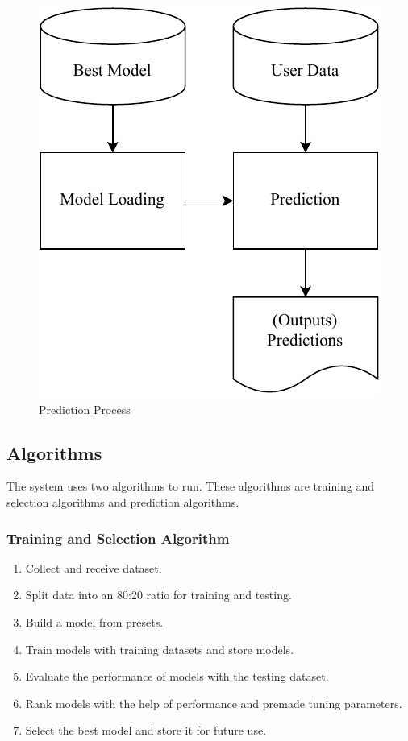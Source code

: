 \documentclass[a4paper,fleqn]{cas-dc}
\begin{document}
\begin{figure}[ht]
    \centering
    \includegraphics[width=0.7\columnwidth]{prediction.pdf}
    \caption{Prediction Process}
    \label{fig:prediction_process}
\end{figure}

\subsection{Algorithms}\label{subsec:algorithms}

The system uses two algorithms to run. These algorithms are training and selection algorithms and prediction algorithms.

\vspace{-0.5em}
\subsubsection*{Training and Selection Algorithm}\label{subsubsec:training_and_selection_algorithm}
\vspace{0.5em}
\begin{enumerate}
    \item Collect and receive dataset.
    \item Split data into an 80:20 ratio for training and testing.
    \item Build a model from presets.
    \item Train models with training datasets and store models.
    \item Evaluate the performance of models with the testing dataset.
    \item Rank models with the help of performance and premade tuning parameters.
    \item Select the best model and store it for future use.
\end{enumerate}
\end{document}

